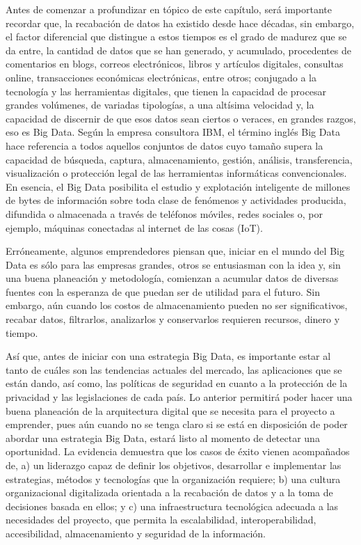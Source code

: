 \documentclass[
  letterpaper,
  DIV=11,
  numbers=noendperiod]{scrreprt}
\begin{document}
Antes de comenzar a profundizar en tópico de este capítulo, será
importante recordar que, la recabación de datos ha existido desde hace
décadas, sin embargo, el factor diferencial que distingue a estos
tiempos es el grado de madurez que se da entre, la cantidad de datos que
se han generado, y acumulado, procedentes de comentarios en blogs,
correos electrónicos, libros y artículos digitales, consultas online,
transacciones económicas electrónicas, entre otros; conjugado a la
tecnología y las herramientas digitales, que tienen la capacidad de
procesar grandes volúmenes, de variadas tipologías, a una altísima
velocidad y, la capacidad de discernir de que esos datos sean ciertos o
veraces, en grandes razgos, eso es Big Data. Según la empresa consultora
IBM, el término inglés Big Data hace referencia a todos aquellos
conjuntos de datos cuyo tamaño supera la capacidad de búsqueda, captura,
almacenamiento, gestión, análisis, transferencia, visualización o
protección legal de las herramientas informáticas convencionales. En
esencia, el Big Data posibilita el estudio y explotación inteligente de
millones de bytes de información sobre toda clase de fenómenos y
actividades producida, difundida o almacenada a través de teléfonos
móviles, redes sociales o, por ejemplo, máquinas conectadas al internet
de las cosas (IoT).

Erróneamente, algunos emprendedores piensan que, iniciar en el mundo del
Big Data es sólo para las empresas grandes, otros se entusiasman con la
idea y, sin una buena planeación y metodología, comienzan a acumular
datos de diversas fuentes con la esperanza de que puedan ser de utilidad
para el futuro. Sin embargo, aún cuando los costos de almacenamiento
pueden no ser significativos, recabar datos, filtrarlos, analizarlos y
conservarlos requieren recursos, dinero y tiempo.

Así que, antes de iniciar con una estrategia Big Data, es importante
estar al tanto de cuáles son las tendencias actuales del mercado, las
aplicaciones que se están dando, así como, las políticas de seguridad en
cuanto a la protección de la privacidad y las legislaciones de cada
país. Lo anterior permitirá poder hacer una buena planeación de la
arquitectura digital que se necesita para el proyecto a emprender, pues
aún cuando no se tenga claro si se está en disposición de poder abordar
una estrategia Big Data, estará listo al momento de detectar una
oportunidad. La evidencia demuestra que los casos de éxito vienen
acompañados de, a) un liderazgo capaz de definir los objetivos,
desarrollar e implementar las estrategias, métodos y tecnologías que la
organización requiere; b) una cultura organizacional digitalizada
orientada a la recabación de datos y a la toma de decisiones basada en
ellos; y c) una infraestructura tecnológica adecuada a las necesidades
del proyecto, que permita la escalabilidad, interoperabilidad,
accesibilidad, almacenamiento y seguridad de la información.
\end{document}
